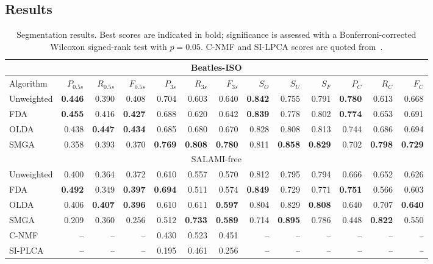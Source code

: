 \documentclass{article}
\begin{document}
\subsection{Results}
\label{sec:results}
\begin{table}
\centering
\caption{Segmentation results. Best scores are indicated in bold; significance is assessed with a Bonferroni-corrected Wilcoxon
signed-rank test with $p=0.05$. C-NMF and SI-LPCA scores are quoted from~\cite{nieto2013convex}.\label{tab:results}}
\footnotesize
\begin{tabular}{lrrrrrrrrrrrr}
\multicolumn{13}{c}{Beatles-ISO}\\
\toprule%
Algorithm   &   $P_{0.5s}$ & $R_{0.5s}$ & $F_{0.5s}$ & $P_{3s}$     & $R_{3s}$  & $F_{3s}$   & $S_O$ & $S_U$ & $S_F$ & $P_C$& $R_C$& $F_C$\\
\hline
Unweighted  &   \textbf{0.446} & 0.390 & 0.408 & 0.704   & 0.603 & 0.640 & \textbf{0.842} & 0.755 & 0.791 & \textbf{0.780} & 0.613 & 0.668\\
FDA         &   \textbf{0.455} & 0.416 & \textbf{0.427} & 0.688 & 0.620 & 0.642 & \textbf{0.839} & 0.778 & 0.802 & \textbf{0.774} & 0.653 & 0.691\\
OLDA        &   0.438 & \textbf{0.447} & \textbf{0.434} & 0.685   & 0.680 & 0.670 & 0.828 & 0.808 & 0.813 & 0.744 & 0.686 & 0.694\\
\hline
SMGA~\hfill\cite{serra2012unsupervised}
            &   0.358 & 0.393 & 0.370 & \textbf{0.769}   & \textbf{0.808} & \textbf{0.780} & 0.811 & \textbf{0.858} & \textbf{0.829} & 0.702 & \textbf{0.798} &
            \textbf{0.729}\\
\toprule%
\multicolumn{13}{c}{SALAMI-free}\\
\toprule%
Unweighted  & 0.400 & 0.364 & 0.372 & 0.610 & 0.557 & 0.570 & 0.812 & 0.795 & 0.794 & 0.666 & 0.652 & 0.626\\
FDA     &  \textbf{0.492} & 0.349 & \textbf{0.397} & \textbf{0.694} & 0.511 & 0.574 & \textbf{0.849} & 0.729 & 0.771 &
\textbf{0.751} & 0.566 & 0.603\\
OLDA    &  0.406 & \textbf{0.407} & \textbf{0.396} & 0.610 & 0.611 & \textbf{0.597} & 0.804 & 0.829 & \textbf{0.808} & 0.640 & 0.707 & \textbf{0.640}\\
\hline
SMGA~\hfill\cite{serra2012unsupervised}
        & 0.209 & 0.360 & 0.256 & 0.512 & \textbf{0.733} & \textbf{0.589} & 0.714 & \textbf{0.895} & 0.786 & 0.448 & \textbf{0.822} & 0.550\\
C-NMF~\hfill\cite{nieto2013convex}            
        & -- & -- & -- & 0.430 & 0.523 & 0.451 & -- & -- & -- & -- & -- & -- \\
SI-PLCA~\hfill\cite{weiss2011unsupervised}    
        & -- & -- & -- & 0.195 & 0.461 & 0.256 & -- & -- & -- & -- & -- & -- \\  
\bottomrule%
\end{tabular}
\end{table}
\end{document}
